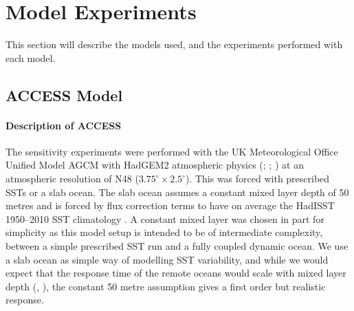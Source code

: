 
\section{Model Experiments}

This section will describe the models used, and the experiments performed with 
each model.


\subsection{ACCESS Model}

\paragraph{Description of ACCESS}
The sensitivity experiments were performed with the UK Meteorological Office 
Unified Model AGCM with HadGEM2 atmospheric physics (\citet{Davies2005}; 
\citet{Martin2010}; \citet{Bellouin2011}) at an atmospheric resolution of N48 
($3.75^{\circ} \times 
2.5^{\circ}$). This was forced with prescribed SSTs or a slab ocean. The slab
ocean assumes a constant mixed layer depth of 50 metres and is forced by flux 
correction terms to have on average the HadISST 1950--2010 SST climatology 
\citep{Wang2014}. A constant mixed layer was chosen in part for simplicity as 
this model setup is intended to be of intermediate complexity, between a simple 
prescribed SST run and a fully coupled dynamic ocean. We use a slab ocean as 
simple way of modelling SST variability, and while we would expect that the 
response time of the remote oceans would scale with mixed layer depth 
(\citealt{Su2005a}, \citealt{Lintner2007}), the constant 
50 metre assumption gives a first order but realistic response.

